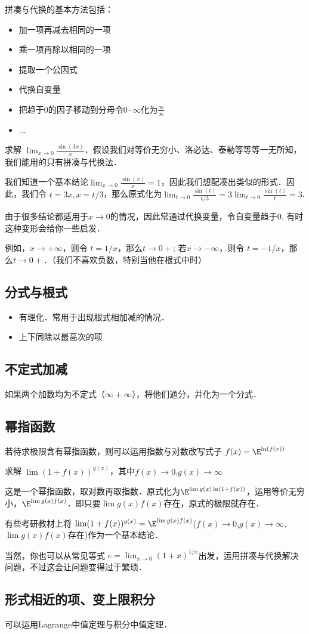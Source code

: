 拼凑与代换的基本方法包括：
\begin{itemize}
\item 加一项再减去相同的一项
\item 乘一项再除以相同的一项
\item 提取一个公因式
\item 代换自变量
\item 把趋于0的因子移动到分母令$0\cdot\infty$化为$\frac{\infty}{\infty}$
\item ...
\end{itemize}

\begin{example}{}
求解 $\lim_{x \to 0} \frac{\sin(3x)}{x}$．假设我们对等价无穷小、洛必达、泰勒等等等一无所知，我们能用的只有拼凑与代换法．

我们知道一个基本结论$\lim_{x \to 0} \frac{\sin(x)}{x}=1$，因此我们想配凑出类似的形式．因此，我们令 $t=3x, x=t/3$，那么原式化为$\lim_{t \to 0} \frac{\sin(t)}{t/3}=3\lim_{t \to 0} \frac{\sin(t)}{t}=3$.
\end{example}

\begin{example}{}
由于很多结论都适用于$x\to0$的情况，因此常通过代换变量，令自变量趋于0. 有时这种变形会给你一些启发．

例如，$x\to+\infty$，则令 $t=1/x$，那么$t\to0+$; 若$x\to-\infty$，则令 $t=-1/x$，那么$t\to0+$．（我们不喜欢负数，特别当他在根式中时）
\end{example}

\subsection{分式与根式}
\begin{itemize}
\item 有理化．常用于出现根式相加减的情况．
\item 上下同除以最高次的项
\end{itemize}

\subsection{不定式加减}
如果两个加数均为不定式（$\infty+\infty$），将他们通分，并化为一个分式．

\subsection{幂指函数}
若待求极限含有幂指函数，则可以运用指数与对数改写式子 $f(x)=\E^{\ln(f(x))}$
\begin{example}{}
求解 $\lim (1+f(x))^{g(x)}$，其中$f(x)\to0$,$g(x)\to\infty$

这是一个幂指函数，取对数再取指数．原式化为$\E^{\lim g(x) \ln (1+f(x))}$，运用等价无穷小，$\E^{\lim g(x) f(x)}$．即只要$\lim g(x) f(x)$存在，原式的极限就存在．

有些考研教材上将 $\lim (1+f(x))^{g(x)} = \E^{\lim g(x) f(x) }$($f(x)\to0$,$g(x)\to\infty$,$\lim g(x) f(x)$存在)作为一个基本结论．

当然，你也可以从常见等式 $e=\lim_{x\to0} (1+x)^{1/x}$出发，运用拼凑与代换解决问题，不过这会让问题变得过于繁琐．
\end{example}

\subsection{形式相近的项、变上限积分}
可以运用Lagrange中值定理与积分中值定理．